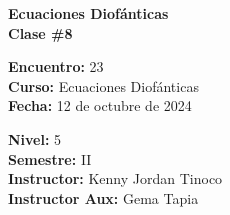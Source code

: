 \begin{center} \textbf
{
    \Large Ecuaciones Diofánticas \\ \vspace{2mm}Clase \#8
}
\end{center}

\begin{multicols}{2}
{
    \textbf{Encuentro:} 23\\
    \textbf{Curso:} Ecuaciones Diofánticas\\
    \textbf{Fecha:} 12 de octubre de 2024\\
    \begin{flushright}
        \textbf{Nivel:} 5\\
        \textbf{Semestre:} II\\
        \textbf{Instructor:} Kenny Jordan Tinoco\\
        \textbf{Instructor Aux:} Gema Tapia
    \end{flushright}
}
\end{multicols}

\thispagestyle{first-page-style}